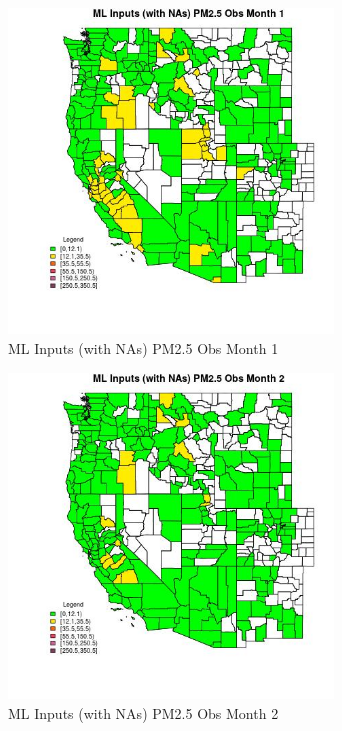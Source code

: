 
\clearpage 

\begin{figure} 
\centering  
\includegraphics[width=0.77\textwidth]{Code_Outputs/Report_ML_input_PM25_Step4_part_e_de_duplicated_aves_compiled_2019-05-21wNAs_CountyPM25_ObsmedianMonth1.jpg} 
\caption{\label{fig:Report_ML_input_PM25_Step4_part_e_de_duplicated_aves_compiled_2019-05-21wNAsCountyPM25_ObsmedianMonth1}ML Inputs (with NAs) PM2.5 Obs Month 1} 
\end{figure} 
 

\begin{figure} 
\centering  
\includegraphics[width=0.77\textwidth]{Code_Outputs/Report_ML_input_PM25_Step4_part_e_de_duplicated_aves_compiled_2019-05-21wNAs_CountyPM25_ObsmedianMonth2.jpg} 
\caption{\label{fig:Report_ML_input_PM25_Step4_part_e_de_duplicated_aves_compiled_2019-05-21wNAsCountyPM25_ObsmedianMonth2}ML Inputs (with NAs) PM2.5 Obs Month 2} 
\end{figure} 
 

